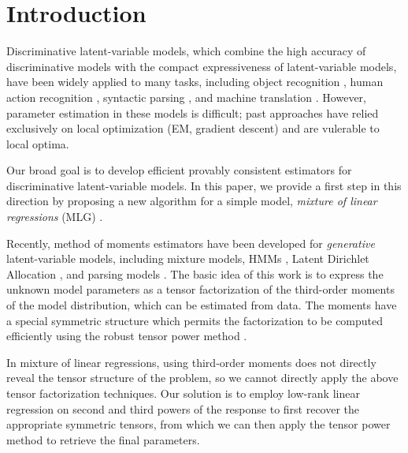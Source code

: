 \section{Introduction}
\label{sec:intro}

Discriminative latent-variable models,
which combine the high accuracy of discriminative models
with the compact expressiveness of latent-variable models,
have been widely applied to many tasks, including
object recognition \cite{quattoni04nips},
human action recognition \cite{wang09},
syntactic parsing \cite{petrov08discriminative},
and machine translation \cite{liang06discrimative}.
However, parameter estimation in these models is difficult;
past approaches have relied exclusively on local optimization (EM, 
gradient descent) and are vulerable to local optima.

Our broad goal is to develop efficient provably consistent estimators for
discriminative latent-variable models.
In this paper, we provide a first step in this 
direction by proposing a new algorithm for a simple model,
\emph{mixture of linear regressions} (MLG) \cite{VieleTong2002}.

Recently, method of moments estimators have been developed for
\emph{generative} latent-variable models, including
mixture models, HMMs \cite{AnandkumarHsuKakade2012},
Latent Dirichlet Allocation \cite{AnandkumarLDA},
and parsing models \cite{HsuKakadeLiang2012}.
The basic idea of this work is to express
the unknown model parameters as a tensor factorization
of the third-order moments of the model distribution, which
can be estimated from data.
The moments have a special symmetric structure
which permits the factorization to be computed efficiently using the robust
tensor power method \cite{AnandkumarGeHsu2012}.

In mixture of linear regressions, using third-order moments does not directly
reveal the tensor structure of the problem, so we cannot directly
apply the above tensor factorization techniques.
Our solution is to employ low-rank linear regression \cite{NegahbanWainwright2009,Tomioka2011} on second
and third powers of the response to first recover the appropriate symmetric
tensors, from which we can then apply the tensor power method to retrieve the
final parameters.

